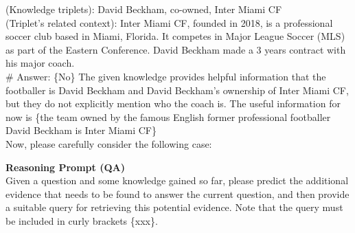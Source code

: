 \documentclass[11pt,UTF8,fontset=fandol]{ctexart}
\begin{document}
\begin{promptbox}
(Knowledge triplets): David Beckham, co-owned, Inter Miami CF\\
(Triplet's related context): Inter Miami CF, founded in 2018, is a professional soccer club based in Miami, Florida. It competes in Major League Soccer (MLS) as part of the Eastern Conference. David Beckham made a 3 years contract with his major coach.\\
\# Answer: \{No\} The given knowledge provides helpful information that the footballer is David Beckham and David Beckham's ownership of Inter Miami CF, but they do not explicitly mention who the coach is. The useful information for now is \{the team owned by the famous English former professional footballer David Beckham is Inter Miami CF\}\\[0.3em]
Now, please carefully consider the following case:
\end{promptbox}

\begin{table}[H]\centering
\caption{Query Re-form Prompt（查询重构提示词）。}
\label{tab:19}
\end{table}
\vspace{-1.2em}
\begin{promptbox}
\small
\textbf{Reasoning Prompt (QA)}\\
Given a question and some knowledge gained so far, please predict the additional evidence that needs to be found to answer the current question, and then provide a suitable query for retrieving this potential evidence. Note that the query must be included in curly brackets \{xxx\}.
\end{promptbox}
\end{document}
